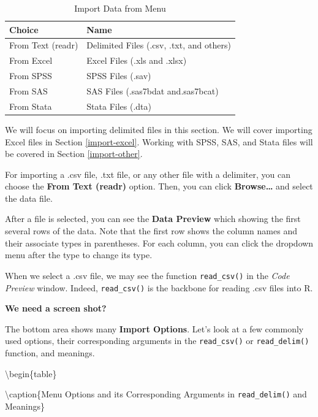 \documentclass[
]{book}
\begin{document}
\begin{table}

\caption{\label{tab:importMenu}Import Data from Menu}
\centering
\begin{tabular}[t]{l|l}
\hline
Choice & Name\\
\hline
From Text (readr) & Delimited Files (.csv, .txt, and others)\\
\hline
From Excel & Excel Files (.xls and .xlsx)\\
\hline
From SPSS & SPSS Files (.sav)\\
\hline
From SAS & SAS Files (.sas7bdat and.sas7bcat)\\
\hline
From Stata & Stata Files (.dta)\\
\hline
\end{tabular}
\end{table}

We will focus on importing delimited files in this section. We will cover importing Excel files in Section \ref{import-excel}. Working with SPSS, SAS, and Stata files will be covered in Section \ref{import-other}.

For importing a .csv file, .txt file, or any other file with a delimiter, you can choose the \textbf{From Text (readr)} option. Then, you can click \textbf{Browse\ldots{}} and select the data file.

After a file is selected, you can see the \textbf{Data Preview} which showing the first several rows of the data. Note that the first row shows the column names and their associate types in parentheses. For each column, you can click the dropdown menu after the type to change its type.

When we select a .csv file, we may see the function \texttt{read\_csv()} in the \emph{Code Preview} window. Indeed, \texttt{read\_csv()} is the backbone for reading .csv files into R.

\textbf{We need a screen shot?}

The bottom area shows many \textbf{Import Options}. Let's look at a few commonly used options, their corresponding arguments in the \texttt{read\_csv()} or \texttt{read\_delim()} function, and meanings.

\textbackslash begin\{table\}

\textbackslash caption\{\label{tab:importOptions}Menu Options and its Corresponding Arguments in \texttt{read\_delim()} and Meanings\}
\centering
\end{document}
